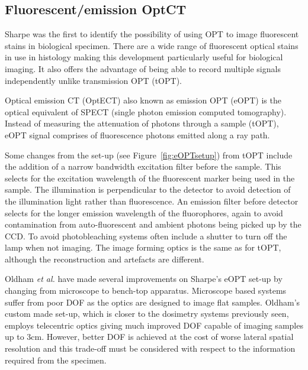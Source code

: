 \documentclass[12pt]{article}
\begin{document}
\subsection{Fluorescent/emission  OptCT}
\label{subsec:eOPT}

Sharpe was the first to identify the possibility of using OPT to image fluorescent stains in biological specimen. \cite{Sharpe:2002jp} There are a wide range of fluorescent optical stains in use in histology making this development particularly useful for biological imaging. It also offers the advantage of being able to record multiple signals independently unlike  transmission OPT (tOPT). \cite{Sharpe:2002jp} 


Optical emission CT (OptECT) also known as emission OPT (eOPT) is the optical equivalent of SPECT (single photon emission computed tomography). \cite{Oldham:2007ku}  Instead of measuring the attenuation of photons through a sample (tOPT), eOPT signal comprises of fluorescence photons emitted along a ray path. \cite{Walls:2005ja}



Some changes from the set-up (see Figure~\ref{fig:eOPTsetup}) from tOPT  include the addition of a narrow bandwidth excitation filter before the sample. This selects for the excitation wavelength of the fluorescent marker being used in the sample. The illumination is perpendicular to the detector to avoid detection of the illumination light rather than fluorescence. An emission filter before detector selects for the longer emission wavelength of the fluorophores, again to avoid contamination from auto-fluorescent and ambient photons being picked up by the CCD. To avoid photobleaching systems often include a shutter to turn off the lamp when not imaging.  The image forming optics is the same as for tOPT, although the reconstruction and artefacts are different. \cite{Walls:2005ja}


Oldham \textit{et al.} have made several improvements  on Sharpe's eOPT set-up by changing from microscope to bench-top apparatus.\cite{Oldham:2006, Oldham:2007ku} Microscope based systems suffer from poor DOF as the optics are designed to image flat samples.  Oldham's custom made set-up, which is closer to the dosimetry systems previously seen, employs telecentric optics giving much improved DOF capable of imaging samples up to 3cm. \cite{Oldham:2007ku} However, better DOF is achieved at the cost of worse lateral spatial resolution and this trade-off must be considered with respect to the information required from the specimen. \cite{Krstajic:2006kna}    
\end{document}
